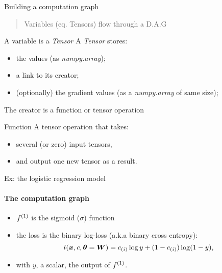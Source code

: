 \begin{frame}{Building a computation graph}
  \begin{quote}
    Variables (eq. Tensors) flow through a D.A.G
  \end{quote}
  \begin{block}{A variable is a  \textit{Tensor}}
    A \textit{Tensor} stores: 
    \begin{itemize}
    \item the values (as \textit{numpy.array}); 
    \item a link to its creator;
    \item (optionally) the gradient values (as a \textit{numpy.array} of same size);
    \end{itemize}
    The creator is a function or tensor operation 
  \end{block}
  \begin{block}{Function}
    A tensor operation that takes:
    \begin{itemize}
    \item several (or zero) input tensors,
    \item and output one new tensor as a result. 
    \end{itemize}
  \end{block}
\end{frame}


\begin{frame}{Ex: the logistic regression model}
  \framesubtitle{The computation graph}
  \begin{center}
  \end{center}
  \begin{itemize}
  \item $f^{(1)}$ is the sigmoid ($\sigma$) function
  \item the loss is the binary log-loss (a.k.a binary cross
    entropy):
    $$
    \ploss(\inp, \class, \params=\W)  %
    = \classi \log y + (1-\classi) \log (1-y),
    $$
  \item with $y$, a scalar, the output of $f^{(1)}$.
  \end{itemize}
\end{frame}

